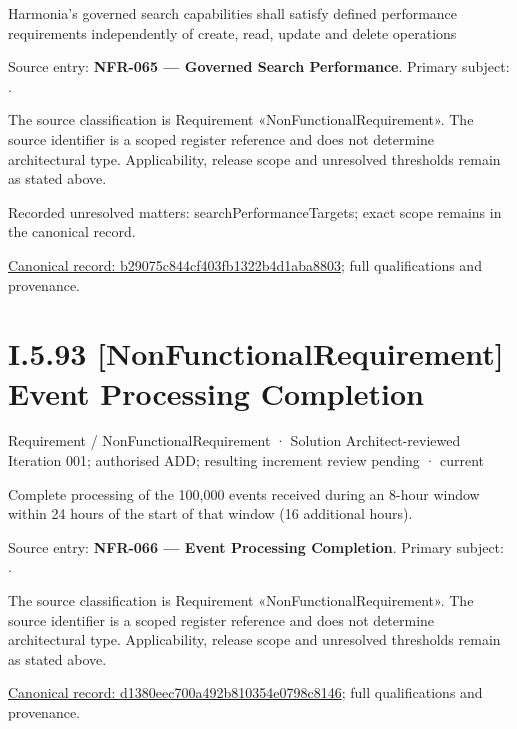Harmonia's governed search capabilities shall satisfy defined performance requirements independently of create, read, update and delete operations



Source entry: \textbf{NFR-065 — Governed Search Performance}. Primary subject: \texttt{}.



The source classification is Requirement «NonFunctionalRequirement». The source identifier is a scoped register reference and does not determine architectural type. Applicability, release scope and unresolved thresholds remain as stated above.


{\small Recorded unresolved matters: searchPerformanceTargets; exact scope remains in the canonical record.}\par
{\footnotesize \href{../../../../continuum/motivation/requirement/non-functional-requirement/b29075c844cf403fb1322b4d1aba8803.md}{Canonical record: b29075c844cf403fb1322b4d1aba8803}; full qualifications and provenance.}\par
\section*{I.5.93 [NonFunctionalRequirement] Event Processing Completion}
\label{navigation:I.5.93}

\label{element:d1380eec700a492b810354e0798c8146}
{\small Requirement / NonFunctionalRequirement · Solution Architect-reviewed Iteration 001; authorised ADD; resulting increment review pending · current}\par

Complete processing of the 100,000 events received during an 8-hour window within 24 hours of the start of that window (16 additional hours).



Source entry: \textbf{NFR-066 — Event Processing Completion}. Primary subject: \texttt{}.



The source classification is Requirement «NonFunctionalRequirement». The source identifier is a scoped register reference and does not determine architectural type. Applicability, release scope and unresolved thresholds remain as stated above.


{\footnotesize \href{../../../../continuum/motivation/requirement/non-functional-requirement/d1380eec700a492b810354e0798c8146.md}{Canonical record: d1380eec700a492b810354e0798c8146}; full qualifications and provenance.}\par
